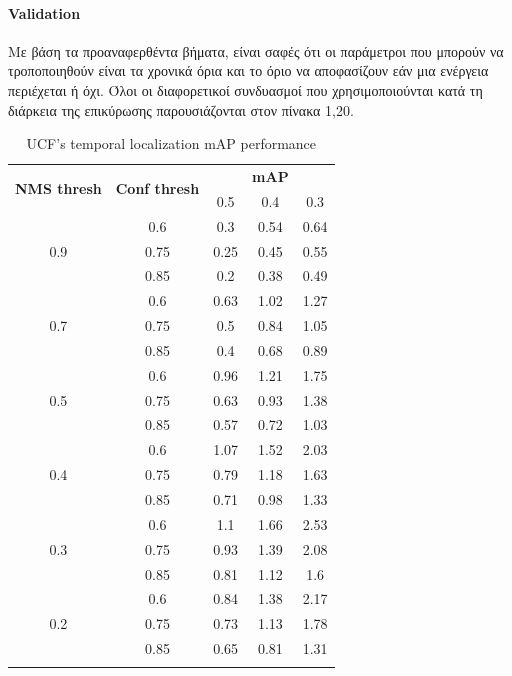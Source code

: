 \documentclass{report}
\newcommand{\tl}{\textlatin}
\begin{document}
\paragraph{\tl{Validation}} Με βάση τα προαναφερθέντα βήματα, είναι σαφές ότι οι παράμετροι
που μπορούν να τροποποιηθούν είναι τα χρονικά όρια και το όριο
να αποφασίζουν εάν μια ενέργεια περιέχεται ή όχι. Όλοι οι διαφορετικοί συνδυασμοί που χρησιμοποιούνται
κατά τη διάρκεια της επικύρωσης παρουσιάζονται στον πίνακα 1,20.

\begin{center}
  \begin{longtable}{|| c | c || c c c ||}

    \hline
    \multirow{2}{*}{\textbf{NMS thresh}} & \multirow{2}{*}{\textbf{Conf thresh}} & {} & \textbf{mAP} & {}  \\
    {} & {} & 0.5 & 0.4 & 0.3\\
    \hline
    \multirow{3}{*}{0.9} & {0.6} & 0.3 & 0.54 & 0.64 \\
    \cline{2-5}
    {} & {0.75} & 0.25 & 0.45 & 0.55 \\
    \cline{2-5}
    {} & {0.85} & 0.2 & 0.38 & 0.49  \\
    \hline
    \multirow{3}{*}{0.7} & {0.6} & 0.63 & 1.02 & 1.27 \\
    \cline{2-5}
    {} & {0.75} & 0.5 & 0.84 & 1.05 \\
    \cline{2-5}
    {} & {0.85} & 0.4 & 0.68 & 0.89 \\
    \hline
    \multirow{3}{*}{0.5} & {0.6} & 0.96 & 1.21 & 1.75 \\
    \cline{2-5}
    {} & {0.75} &  0.63 & 0.93 & 1.38 \\
    \cline{2-5}
    {} & {0.85} & 0.57 & 0.72 & 1.03 \\
    \hline
    \multirow{3}{*}{0.4} & {0.6} & 1.07 & 1.52 & 2.03 \\
    \cline{2-5}
    {} & {0.75} &  0.79 & 1.18 & 1.63 \\
    \cline{2-5}
    {} & {0.85} & 0.71 & 0.98 & 1.33 \\
    \hline
    \multirow{3}{*}{0.3} & {0.6} & 1.1 & 1.66 & 2.53 \\
    \cline{2-5}
    {} & {0.75} &  0.93 & 1.39 & 2.08 \\
    \cline{2-5}
    {} & {0.85} & 0.81 & 1.12 & 1.6 \\
    \hline
    \multirow{3}{*}{0.2} & {0.6} & 0.84 & 1.38 & 2.17 \\
    \cline{2-5}
    {} & {0.75} & 0.73 & 1.13 & 1.78 \\
    \cline{2-5}
    {} & {0.85} & 0.65 & 0.81 & 1.31 \\

    \hline

    \caption{UCF's temporal localization mAP performance}
    \label{table:temp_cls_1}
  \end{longtable}
\end{center}
\end{document}

